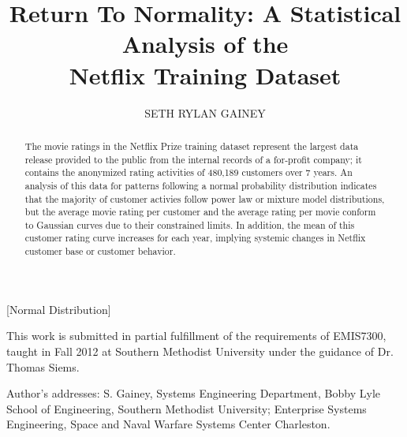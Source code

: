 \documentclass[prodmode,acmtecs]{acmsmall}
\begin{document}

\title{Return To Normality: A Statistical Analysis of the\\ Netflix Training Dataset} %

\author{SETH RYLAN GAINEY}

\begin{abstract}
The movie ratings in the Netflix Prize training dataset represent the largest data release provided to the public from the internal records of a for-profit company; it contains the anonymized rating activities of 480,189 customers over 7 years. An analysis of this data for patterns following a normal probability distribution indicates that the majority of customer activies follow power law or mixture model distributions, but the average movie rating per customer and the average rating per movie conform to Gaussian curves due to their constrained limits. In addition, the mean of this customer rating curve increases for each year, implying systemic changes in Netflix customer base or customer behavior.
\end{abstract}

[Normal Distribution]





\begin{bottomstuff}
This work is submitted in partial fulfillment of the requirements of EMIS7300, taught in Fall 2012 at Southern Methodist University under the guidance of Dr. Thomas Siems.

Author's addresses: S. Gainey, Systems Engineering Department,
Bobby Lyle School of Engineering, Southern Methodist University;
Enterprise Systems Engineering, Space and Naval Warfare Systems Center Charleston.
\end{bottomstuff}

\maketitle
\end{document}
